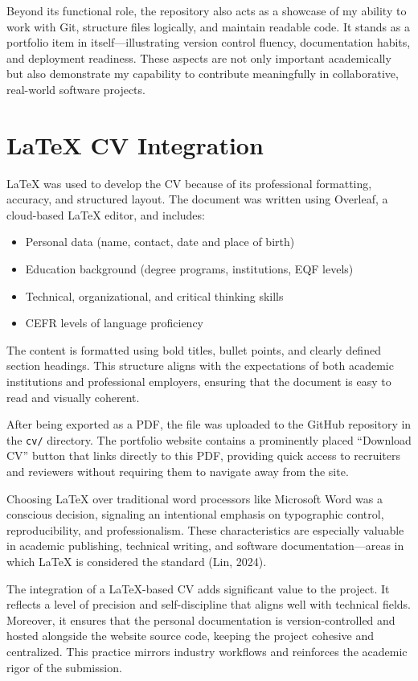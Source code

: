 \documentclass[11pt,a4paper]{article}
\begin{document}
Beyond its functional role, the repository also acts as a showcase of my ability to work with Git, structure files logically, and maintain readable code. It stands as a portfolio item in itself—illustrating version control fluency, documentation habits, and deployment readiness. These aspects are not only important academically but also demonstrate my capability to contribute meaningfully in collaborative, real-world software projects.
\section*{LaTeX CV Integration}

LaTeX was used to develop the CV because of its professional formatting, accuracy, and structured layout. The document was written using Overleaf, a cloud-based LaTeX editor, and includes:

\begin{itemize}
    \item Personal data (name, contact, date and place of birth)
    \item Education background (degree programs, institutions, EQF levels)
    \item Technical, organizational, and critical thinking skills
    \item CEFR levels of language proficiency
\end{itemize}

The content is formatted using bold titles, bullet points, and clearly defined section headings. This structure aligns with the expectations of both academic institutions and professional employers, ensuring that the document is easy to read and visually coherent.

After being exported as a PDF, the file was uploaded to the GitHub repository in the \texttt{cv/} directory. The portfolio website contains a prominently placed “Download CV” button that links directly to this PDF, providing quick access to recruiters and reviewers without requiring them to navigate away from the site.

Choosing LaTeX over traditional word processors like Microsoft Word was a conscious decision, signaling an intentional emphasis on typographic control, reproducibility, and professionalism. These characteristics are especially valuable in academic publishing, technical writing, and software documentation—areas in which LaTeX is considered the standard (Lin, 2024).

The integration of a LaTeX-based CV adds significant value to the project. It reflects a level of precision and self-discipline that aligns well with technical fields. Moreover, it ensures that the personal documentation is version-controlled and hosted alongside the website source code, keeping the project cohesive and centralized. This practice mirrors industry workflows and reinforces the academic rigor of the submission.
\end{document}
